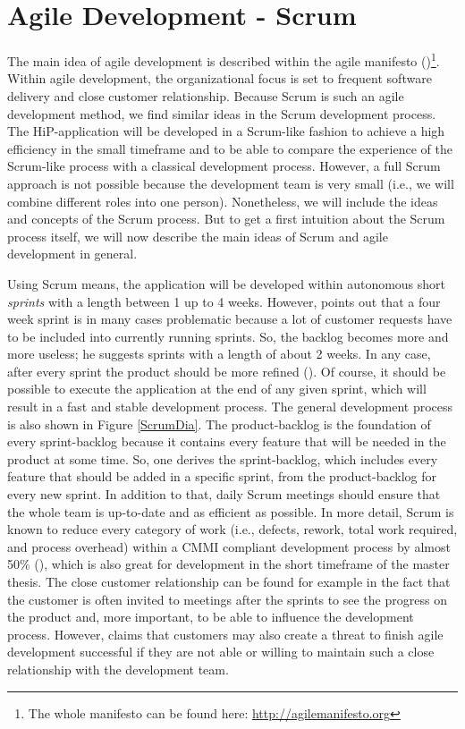 \section{Agile Development - Scrum}
\label{SCRUM-intro}
The main idea of agile development is described within the agile manifesto (\cite{Beck2001agile})\footnote{The whole manifesto can be found here: \url{http://agilemanifesto.org}}. Within agile development, the organizational focus is set to frequent software delivery and close customer relationship. Because Scrum is such an agile development method, we find similar ideas in the Scrum development process. The HiP-application will be developed in a Scrum-like fashion to achieve a high efficiency in the small timeframe and to be able to compare the experience of the Scrum-like process with a classical development process. However, a full Scrum approach is not possible because the development team is very small (i.e.,  we will combine different roles into one person). Nonetheless, we will include the ideas and concepts of the Scrum process. But to get a first intuition about the Scrum process itself, we will now describe the main ideas of Scrum and agile development in general.

Using Scrum means, the application will be developed within autonomous short \textit{sprints} with a length between 1 up to 4 weeks. However, \cite{Ber07} points out that a four week sprint is in many cases problematic because a lot of customer requests have to be included into currently running sprints. So, the backlog becomes more and more useless; he suggests sprints with a length of about 2 weeks. In any case, after every sprint the product should be more refined (\cite{scrum}). Of course, it should be possible to execute the application at the end of any given sprint, which will result in a fast and stable development process. The general development process is also shown in Figure \ref{ScrumDia}. The product-backlog is the foundation of every sprint-backlog because it contains every feature that will be needed in the product at some time. So, one derives the sprint-backlog, which includes every feature that should be added in a specific sprint, from the product-backlog for every new sprint. In addition to that, daily Scrum meetings should ensure that the whole team is up-to-date and as efficient as possible. In more detail, Scrum is known to reduce every category of work (i.e., defects, rework, total work required, and process overhead) within a \ac{CMMI} compliant development process by almost 50\% (\cite{Sut09}), which is also great for development in the short timeframe of the master thesis. The close customer relationship can be found for example in the fact that the customer is often invited to meetings after the sprints to see the progress on the product and, more important, to be able to influence the development process. However, \cite{paulk2002agile} claims that customers may also create a threat to finish agile development successful if they are not able or willing to maintain such a close relationship with the development team.

